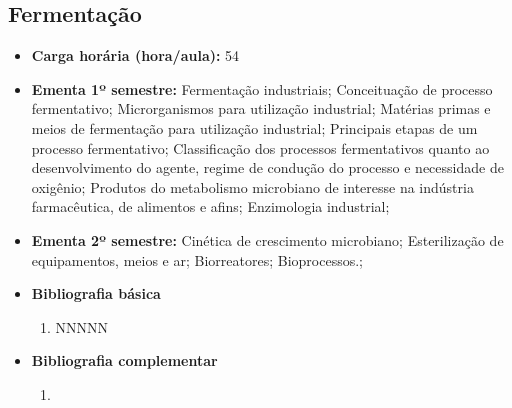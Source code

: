 \documentclass[11pt,fleqn]{book} %
\begin{document}
\subsection{Fermentação}\label{disc:fermentacao}
\begin{itemize}
	\item \textbf{Carga horária (hora/aula):} 54
	\item \textbf{Ementa 1º semestre:}
	Fermentação industriais;
	Conceituação de processo fermentativo; 
	Microrganismos para utilização industrial; 
	Matérias primas e meios de fermentação para utilização industrial; 
	Principais etapas de um processo fermentativo; 
	Classificação dos processos fermentativos quanto ao desenvolvimento do agente, regime de condução do processo e necessidade de oxigênio;
	Produtos do metabolismo microbiano de interesse na indústria farmacêutica, de alimentos e afins; 
	Enzimologia industrial; 
	\item \textbf{Ementa 2º semestre:}	
	Cinética de crescimento microbiano;
	Esterilização de equipamentos, meios e ar;
	Biorreatores;
	Bioprocessos.;
	\item \textbf{Bibliografia básica}
	\begin{enumerate}
		\item NNNNN
	\end{enumerate}
	\item \textbf{Bibliografia complementar}
	\begin{enumerate}
		\item 
	\end{enumerate}	
\end{itemize}
\end{document}
